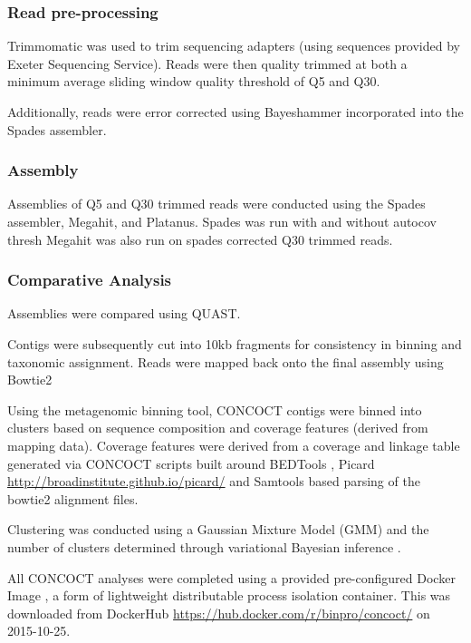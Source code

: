 \subsubsection{Read pre-processing}

Trimmomatic was used to trim sequencing adapters (using sequences
provided by Exeter Sequencing Service).
Reads were then quality trimmed at both a minimum average sliding window
quality threshold of Q5 and Q30. 

Additionally, reads were error corrected using Bayeshammer incorporated into 
the Spades assembler. 

\subsubsection{Assembly}

Assemblies of Q5 and Q30 trimmed reads were conducted using
the Spades assembler, Megahit, and Platanus. 
Spades was run with and without autocov thresh
Megahit was also run on spades corrected Q30 trimmed reads. 

\subsubsection{Comparative Analysis}

Assemblies were compared using QUAST.





Contigs were subsequently cut into 10kb fragments for consistency
in binning and taxonomic assignment.
Reads were mapped back onto the final assembly using Bowtie2 
\citep{Langmead2012} 

Using the metagenomic binning tool, CONCOCT \citep{Alneberg2014}
contigs were binned into clusters based on sequence composition
and coverage features (derived from mapping data).
Coverage features were derived from a coverage and linkage table
generated via CONCOCT scripts built around BEDTools \citep{Quinlan2010,Quinlan2014}, Picard \url{http://broadinstitute.github.io/picard/} 
and Samtools \citep{Li2009} 
based parsing
of the bowtie2 alignment files.

Clustering was conducted using a Gaussian Mixture Model (GMM) \citep{Bishop2006}
and the number of clusters determined through variational Bayesian inference \citep{Corduneanu2001}.

All CONCOCT analyses were completed using a provided pre-configured 
Docker Image \citep{Merkel2014}, a form of lightweight 
distributable process isolation container.
This was downloaded from DockerHub \url{https://hub.docker.com/r/binpro/concoct/}
on 2015-10-25.



